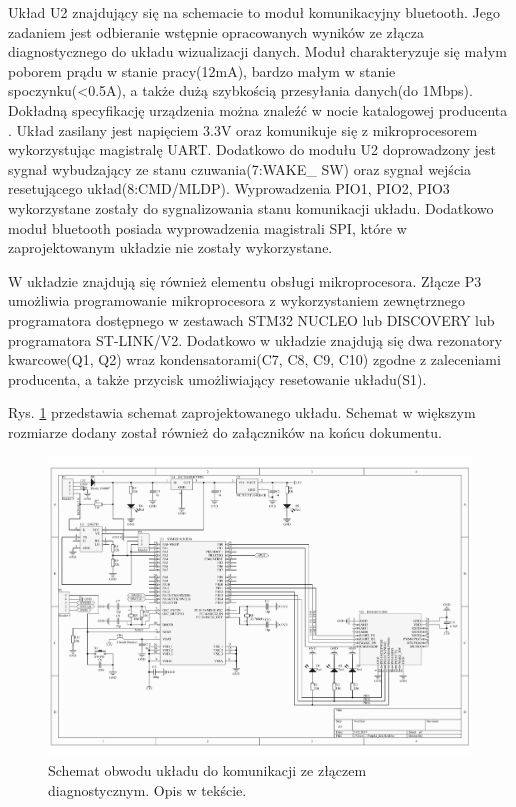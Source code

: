 \documentclass[12pt]{article} %
\numberwithin{equation}{subsection}
\numberwithin{figure}{section}
\numberwithin{table}{section}
\begin{document}
		Układ U2 znajdujący się na schemacie to moduł komunikacyjny bluetooth. Jego zadaniem jest odbieranie wstępnie opracowanych wyników ze złącza diagnostycznego do układu wizualizacji danych. Moduł charakteryzuje się małym poborem prądu w stanie pracy(12mA), bardzo małym w stanie spoczynku(<0.5A), a także dużą szybkością przesyłania danych(do 1Mbps). Dokładną specyfikację urządzenia można znaleźć w nocie katalogowej producenta \cite{RN4020}. Układ zasilany jest napięciem 3.3V oraz komunikuje się z mikroprocesorem wykorzystując magistralę UART. Dodatkowo do modułu U2 doprowadzony jest sygnał wybudzający ze stanu czuwania(7:WAKE\_ SW) oraz sygnał wejścia resetującego układ(8:CMD/MLDP). Wyprowadzenia PIO1, PIO2, PIO3 wykorzystane zostały do sygnalizowania stanu komunikacji układu. Dodatkowo moduł bluetooth posiada wyprowadzenia magistrali SPI, które w zaprojektowanym układzie nie zostały wykorzystane. 
		
		\newpage		
		
		W układzie znajdują się również elementu obsługi mikroprocesora. Złącze P3 umożliwia programowanie mikroprocesora z wykorzystaniem zewnętrznego programatora dostępnego w zestawach STM32 NUCLEO lub DISCOVERY lub programatora ST-LINK/V2. Dodatkowo w układzie znajdują się dwa rezonatory kwarcowe(Q1, Q2) wraz kondensatorami(C7, C8, C9, C10) zgodne z zaleceniami producenta, a także przycisk umożliwiający resetowanie układu(S1). 
		
		Rys. \ref{rys_schemat_ukladu_elektrycznego} przedstawia schemat zaprojektowanego układu. Schemat w większym rozmiarze dodany został również do załączników na końcu dokumentu.
		
		\begin{figure}[!h]
			\centering
			\includegraphics[scale=0.6, angle=90]{Images/SchematUkladuElektrycznego.pdf}
			\caption{Schemat obwodu układu do komunikacji ze złączem diagnostycznym. Opis w tekście.}
			\label{rys_schemat_ukladu_elektrycznego}
		\end{figure}
	
\end{document}

